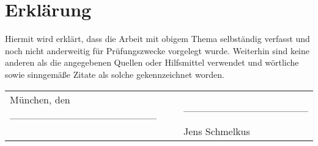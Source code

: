 \chapter*{Erklärung}

Hiermit wird erklärt, dass die Arbeit mit obigem Thema selbständig verfasst und noch nicht anderweitig für Prüfungszwecke vorgelegt wurde. Weiterhin sind keine anderen als die angegebenen Quellen oder Hilfsmittel verwendet und wörtliche sowie sinngemäße Zitate als solche gekennzeichnet worden. \\[2cm]
\begin{tabularx}{\textwidth}{lX}
 München, den \_\_\_\_\_\_\_\_\_\_\_\_\_\_\_\_\_\_\_\_ \hspace{10 mm} & \_\_\_\_\_\_\_\_\_\_\_\_\_\_\_\_\_ \\[0.2cm]
 & \hspace{5 mm} {\footnotesize Jens Schmelkus}
\end{tabularx}



